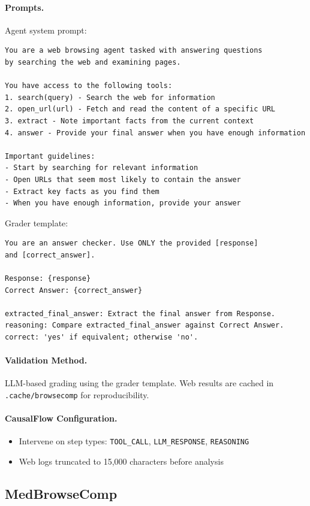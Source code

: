 \documentclass{article}
\theoremstyle{plain}
\theoremstyle{definition}
\theoremstyle{remark}
\begin{document}
\paragraph{Prompts.}
Agent system prompt:
\begin{verbatim}
You are a web browsing agent tasked with answering questions 
by searching the web and examining pages.

You have access to the following tools:
1. search(query) - Search the web for information
2. open_url(url) - Fetch and read the content of a specific URL
3. extract - Note important facts from the current context
4. answer - Provide your final answer when you have enough information

Important guidelines:
- Start by searching for relevant information
- Open URLs that seem most likely to contain the answer
- Extract key facts as you find them
- When you have enough information, provide your answer
\end{verbatim}

Grader template:
\begin{verbatim}
You are an answer checker. Use ONLY the provided [response] 
and [correct_answer].

Response: {response}
Correct Answer: {correct_answer}

extracted_final_answer: Extract the final answer from Response.
reasoning: Compare extracted_final_answer against Correct Answer.
correct: 'yes' if equivalent; otherwise 'no'.
\end{verbatim}

\paragraph{Validation Method.}
LLM-based grading using the grader template. Web results are cached in \texttt{.cache/browsecomp} for reproducibility.

\paragraph{CausalFlow Configuration.}
\begin{itemize}
    \item Intervene on step types: \texttt{TOOL\_CALL}, \texttt{LLM\_RESPONSE}, \texttt{REASONING}
    \item Web logs truncated to 15,000 characters before analysis
\end{itemize}

\subsection{MedBrowseComp}
\label{app:medbrowsecomp}
\end{document}
